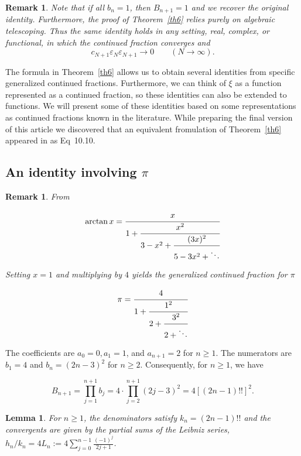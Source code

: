 \documentclass[]{interact}
\theoremstyle{plain}
\numberwithin{equation}{section} %
\newtheorem{lemma}[thm]{Lemma}
\newtheorem{remark}[thm]{Remark}
\numberwithin{table}{section} %
\numberwithin{figure}{section}
\begin{document}
\begin{remark}
Note that if all \(b_n=1\), then \(B_{n+1}=1\) and we recover the original identity. Furthermore, the proof of Theorem~\ref{th6} relies purely on algebraic telescoping. Thus the same identity holds in any setting, real, complex, or functional, in which the continued fraction converges and
\[
c_{N+1}\varepsilon_N\varepsilon_{N+1}\to0
\qquad (N\to\infty).
\]
\end{remark}




The formula in Theorem~\ref{th6} allows us to obtain several identities from
specific generalized continued fractions. Furthermore, we can think of $\xi$ as a function represented as a continued fraction, so these identities can also be extended to functions. We will present some of these identities based on some representations as continued fractions known in the literature. While preparing the final version of this article we discovered that an equivalent fromulation of Theorem~\ref{th6} appeared in \cite{bhatn} as Eq~10.10.


\subsection{An identity involving $\pi$ }




\begin{remark}

From \cite{euler1785transformatione}

$$\arctan x = \cfrac{x}{1 + \cfrac{x^2}{3-x^2 + \cfrac{(3x)^2}{5-3x^2 + \ddots}}}$$



Setting $x=1$ and multiplying by $4$ yields the generalized continued fraction for $\pi$


$$\pi = \cfrac{4}{1 + \cfrac{1^2}{2 + \cfrac{3^2}{2 + \ddots}}}$$



    
\end{remark}




The coefficients are $a_0=0, a_1=1$, and $a_{n+1}=2$ for $n\ge 1$. The numerators are $b_1=4$ and $b_n=(2n-3)^2$ for $n\ge 2$. Consequently, for $n \ge 1$, we have

$$B_{n+1} = \prod_{j=1}^{n+1} b_j = 4 \cdot \prod_{j=2}^{n+1} (2j-3)^2 = 4[(2n-1)!!]^2.$$


\begin{lemma}

For $n \geq 1$, the denominators satisfy $k_n = (2n-1)!!$ and the convergents are given by the partial sums of the Leibniz series, $h_n/k_n = 4L_n:=4\sum_{j=0}^{n-1} \frac{(-1)^j}{2j+1}$.

    
\end{lemma}
\end{document}
